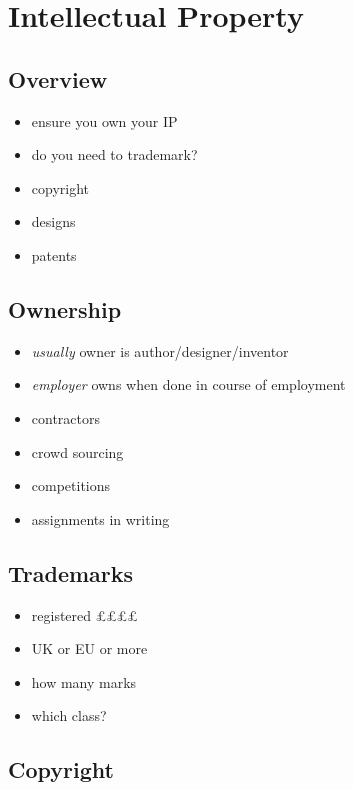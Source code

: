 \section{Intellectual Property}\label{intellectual-property}

\subsection{Overview}\label{overview-3}

\begin{itemize}
\itemsep1pt\parskip0pt
\item
  ensure you own your IP
\item
  do you need to trademark?
\item
  copyright
\item
  designs
\item
  patents
\end{itemize}

\subsection{Ownership}\label{ownership}

\begin{itemize}
\itemsep1pt\parskip0pt
\item
  \emph{usually} owner is author/designer/inventor
\item
  \emph{employer} owns when done in course of employment
\item
  contractors
\item
  crowd sourcing
\item
  competitions
\item
  assignments in writing
\end{itemize}

\subsection{Trademarks}\label{trademarks}

\begin{itemize}
\itemsep1pt\parskip0pt
\item
  registered ££££
\item
  UK or EU or more
\item
  how many marks
\item
  which class?
\end{itemize}

\subsection{Copyright}\label{copyright}

